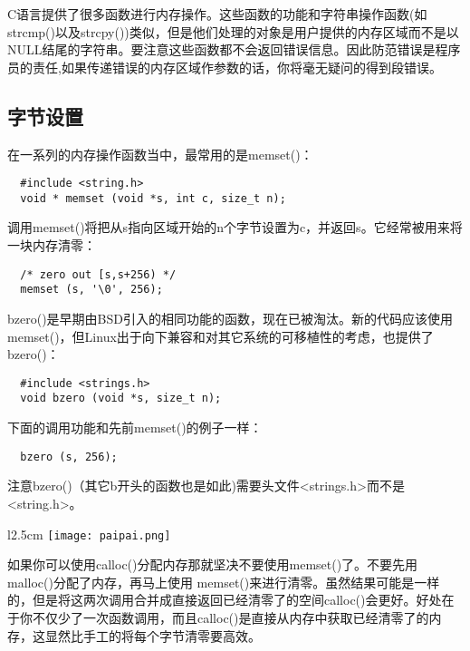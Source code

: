 C语言提供了很多函数进行内存操作。这些函数的功能和字符串操作函数(如strcmp()以及strcpy())类似，但是他们处理的对象是用户提供的内存区域而不是以NULL结尾的字符串。要注意这些函数都不会返回错误信息。因此防范错误是程序员的责任,如果传递错误的内存区域作参数的话，你将毫无疑问的得到段错误。 

\subsection{字节设置}

在一系列的内存操作函数当中，最常用的是memset()： 

\begin{lstlisting}
  #include <string.h>
  void * memset (void *s, int c, size_t n);
\end{lstlisting}

调用memset()将把从s指向区域开始的n个字节设置为c，并返回s。它经常被用来将一块内存清零： 

\begin{lstlisting}
  /* zero out [s,s+256) */
  memset (s, '\0', 256);
\end{lstlisting}

bzero()是早期由BSD引入的相同功能的函数，现在已被淘汰。新的代码应该使用memset()，但Linux出于向下兼容和对其它系统的可移植性的考虑，也提供了bzero()：

\begin{lstlisting}
  #include <strings.h>
  void bzero (void *s, size_t n);
\end{lstlisting}

下面的调用功能和先前memset()的例子一样： 

\begin{lstlisting}
  bzero (s, 256);
\end{lstlisting}

注意bzero()（其它b开头的函数也是如此)需要头文件<strings.h>而不是<string.h>。

\begin{wrapfigure}{l}{2.5cm}
  \texttt{[image: paipai.png]}
\end{wrapfigure}
\mbox{}\begin{flushleft}如果你可以使用calloc()分配内存那就坚决不要使用memset()了。不要先用malloc()分配了内存，再马上使用 memset()来进行清零。虽然结果可能是一样的，但是将这两次调用合并成直接返回已经清零了的空间calloc()会更好。好处在于你不仅少了一次函数调用，而且calloc()是直接从内存中获取已经清零了的内存，这显然比手工的将每个字节清零要高效。\end{flushleft}

